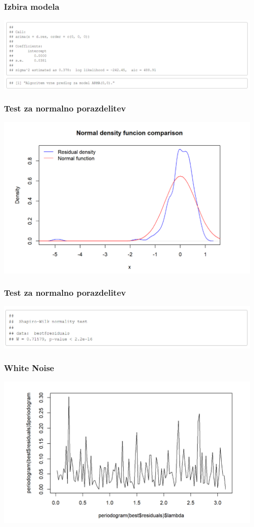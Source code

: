 \documentclass[10pt]{beamer}
\begin{document}
\begin{frame}
\frametitle{Izbira modela}
\includegraphics[width=1\textwidth]{ModelB.png}
\end{frame}


\begin{frame}
\frametitle{Test za normalno porazdelitev}
\includegraphics[width=1\textwidth]{normalnaB.png}

\end{frame}

\begin{frame}
\frametitle{Test za normalno porazdelitev}
\includegraphics[width=1\textwidth]{ShapiroB.png}

\end{frame}


\begin{frame}
\frametitle{White Noise}
\includegraphics[width=1\textwidth]{white_noiseB.png}
\end{frame}
\end{document}
